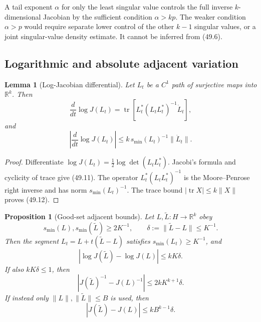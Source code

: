 \documentclass[11pt]{article}
\newtheorem{lemma}[theorem]{Lemma}
\newtheorem{proposition}[theorem]{Proposition}
\begin{document}
\begin{warning}
\label{warn:v11v49-dimension}
A tail exponent \(\alpha\) for only the least singular value controls
the full inverse \(k\)-dimensional Jacobian by the sufficient condition
\(\alpha>kp\).  The weaker condition \(\alpha>p\) would require
separate lower control of the other \(k-1\) singular values, or a
joint singular-value density estimate.  It cannot be inferred from
(49.6).
\end{warning}

\subsection{Logarithmic and absolute adjacent variation}

\begin{lemma}[Log-Jacobian differential]
\label{lem:v11v49-log}
Let \(L_t\) be a \(C^1\) path of surjective maps into
\(\mathbb R^k\).  Then
\[
 \frac d{dt}\log J(L_t)
 =\operatorname{tr}\!\left[
    L_t^*(L_tL_t^*)^{-1}\dot L_t\right],                      \tag{49.11}
\]
and
\[
 \left|\frac d{dt}\log J(L_t)\right|
 \le k\,s_{\min}(L_t)^{-1}\lVert\dot L_t\rVert.               \tag{49.12}
\]
\end{lemma}

\begin{proof}
Differentiate
\(\log J(L_t)=\frac12\log\det(L_tL_t^*)\).
Jacobi's formula and cyclicity of trace give (49.11).  The operator
\(L_t^*(L_tL_t^*)^{-1}\) is the Moore--Penrose right inverse and has
norm \(s_{\min}(L_t)^{-1}\).  The trace bound
\(|\operatorname{tr}X|\le k\lVert X\rVert\) proves (49.12).
\end{proof}

\begin{proposition}[Good-set adjacent bounds]
\label{prop:v11v49-adjacent}
Let \(L,\widetilde L:H\to\mathbb R^k\) obey
\[
 s_{\min}(L),s_{\min}(\widetilde L)\ge2K^{-1},\qquad
 \delta:=\lVert\widetilde L-L\rVert\le K^{-1}.                \tag{49.13}
\]
Then the segment \(L_t=L+t(\widetilde L-L)\) satisfies
\(s_{\min}(L_t)\ge K^{-1}\), and
\[
       |\log J(\widetilde L)-\log J(L)|\le kK\delta.           \tag{49.14}
\]
If also \(kK\delta\le1\), then
\[
       |J(\widetilde L)^{-1}-J(L)^{-1}|
                     \le 2kK^{k+1}\delta.                     \tag{49.15}
\]
If instead only \(\lVert L\rVert,\lVert\widetilde L\rVert\le B\)
is used, then
\[
                  |J(\widetilde L)-J(L)|
                     \le kB^{k-1}\delta.                      \tag{49.16}
\]
\end{proposition}
\end{document}
